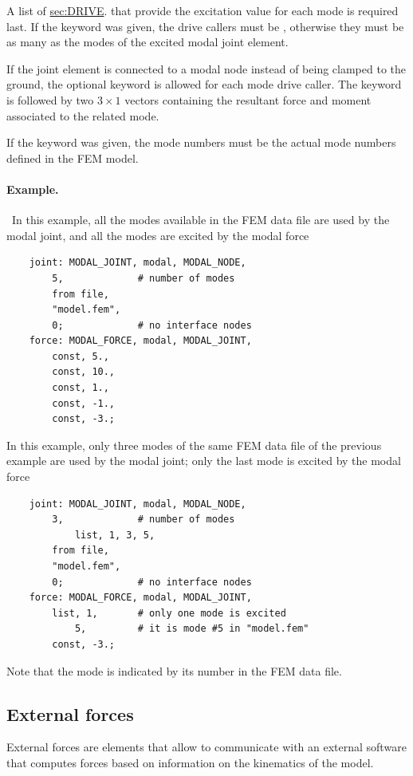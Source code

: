 A list of
\hyperref{\kw{drive callers}}{\kw{drive callers} (see Section~}{)}{sec:DRIVE}.
that provide the excitation value for each mode is required last.
If the keyword  was given, the drive callers
must be , otherwise they must be as many
as the modes of the excited modal joint element.

If the  joint element is connected to a modal node
instead of being clamped to the ground, the optional keyword 
is allowed for each mode drive caller.
The keyword  is followed by two $3\times 1$ vectors
containing the resultant force and moment associated to the related mode.

If the keyword  was given, the mode numbers must be
the actual mode numbers defined in the FEM model.

\paragraph{Example.} \
In this example, all the modes available in the FEM data file 
are used by the modal joint, and all the modes are excited
by the modal force
\begin{verbatim}
    joint: MODAL_JOINT, modal, MODAL_NODE,
        5,             # number of modes
        from file,
        "model.fem",
        0;             # no interface nodes
    force: MODAL_FORCE, modal, MODAL_JOINT,
        const, 5.,
        const, 10.,
        const, 1.,
        const, -1.,
        const, -3.;
\end{verbatim}

In this example, only three modes of the same FEM data file
of the previous example are used by the modal joint;
only the last mode is excited by the modal force
\begin{verbatim}
    joint: MODAL_JOINT, modal, MODAL_NODE,
        3,             # number of modes
            list, 1, 3, 5,
        from file,
        "model.fem",
        0;             # no interface nodes
    force: MODAL_FORCE, modal, MODAL_JOINT,
        list, 1,       # only one mode is excited
            5,         # it is mode #5 in "model.fem"
        const, -3.;
\end{verbatim}
Note that the mode is indicated by its number in the FEM data file.




\subsection{External forces}
External forces are elements that allow to communicate
with an external software that computes forces
based on information on the kinematics of the model.

